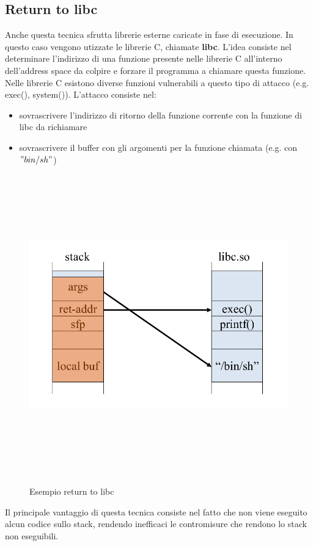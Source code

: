 \subsection{Return to libc}
Anche questa tecnica sfrutta librerie esterne caricate in fase di esecuzione. In questo caso vengono utizzate le librerie C, chiamate \textbf{libc}. L'idea consiste nel determinare l'indirizzo di una funzione presente nelle librerie C all'interno dell'address space da colpire e forzare il programma a chiamare questa funzione. Nelle librerie C esistono diverse funzioni vulnerabili a questo tipo di attacco (e.g. exec(), system()).
L'attacco consiste nel:
\begin{itemize}
  \item sovrascrivere l'indirizzo di ritorno della funzione corrente con la funzione di libc da richiamare 
  \item sovrascrivere il buffer con gli argomenti per la funzione chiamata (e.g. con $"bin/sh"$)
\end{itemize}
\begin{figure}[htbp]
	\centering%
	\subfigure%
	{\includegraphics[height=13cm, width=13cm, keepaspectratio]{Immagini/sistemi_operativi/return_libc.png}}
	\caption{Esempio return to libc\label{fig:return_libc}} 	
\end{figure}
Il principale vantaggio di questa tecnica consiste nel fatto che non viene eseguito alcun codice sullo stack, rendendo inefficaci le contromisure che rendono lo stack non eseguibili.

